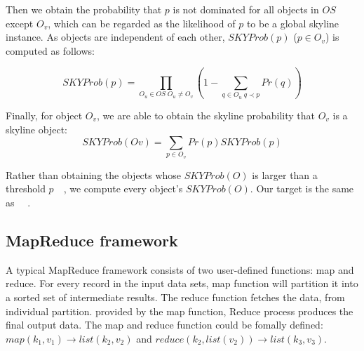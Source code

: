 Then we obtain the probability that \(p\) is not dominated for all objects in \(OS\) except $O_v$, which can be regarded as the likelihood of  $p$ to be a global skyline instance. As objects are independent of each other, \(SKYProb(p)\) (\( p \in O_{v}\)) is computed as follows:

\begin{equation}
SKYProb(p) = \prod_{O_{u} \in OS \; O_{u} \ne O_{v}}(1 - \sum_{q \in O_{u} \; q \prec p}Pr(q))
\end{equation}

Finally, for object \(O_{v}\), we are able to obtain the skyline probability that \(O_{v}\) is a skyline object:
\begin{equation}
\label{equ_final}
SKYProb(O{v}) = \sum_{p \in O_{v}} Pr(p)SKY Prob(p)
\end{equation}

Rather than obtaining the objects whose \(SKYProb(O)\) is larger than a threshold \(p\)~\cite{pei2007}~\cite{ding2012}, we compute every object's \(SKYProb(O)\). Our target is the same as ~\cite{atallah2009}~\cite{kim2011}.

\subsection{MapReduce framework} %
A typical MapReduce framework consists of two user-defined functions: map and reduce. For every record in the input data sets, map function will partition it into a sorted set of intermediate results. The reduce function fetches the data, from individual partition. provided by the map function, Reduce process produces the final output data. The map and reduce function could be fomally defined: \(map(k_{1},v_{1}) \rightarrow list(k_{2}, v_{2}) \) and \(reduce(k_{2},list(v_{2})) \rightarrow list(k_{3}, v_{3}) \).

